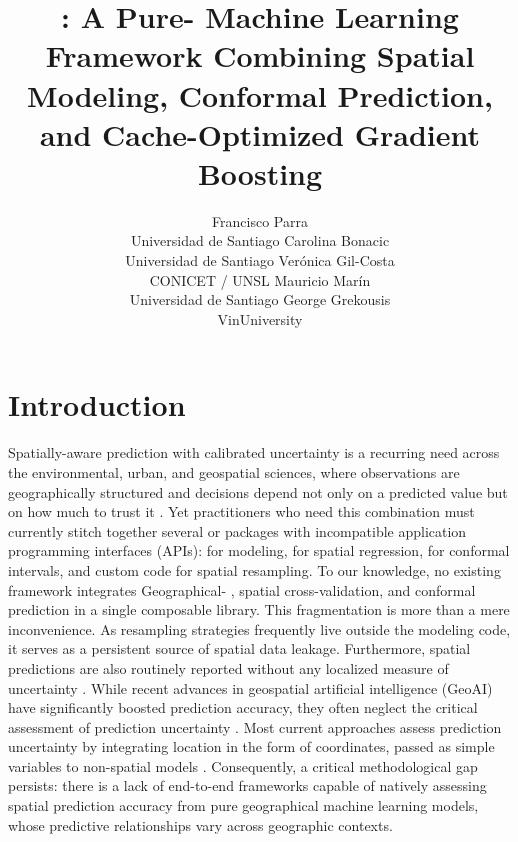 \documentclass[article]{jss}
\author{Francisco Parra\\Universidad de Santiago
   \And Carolina Bonacic\\Universidad de Santiago
   \And Ver\'onica Gil-Costa\\CONICET / UNSL
   \AND Mauricio Mar\'in\\Universidad de Santiago
   \And George Grekousis\\VinUniversity}
\title{\pkg{smelt-ml}: A Pure-\proglang{Rust} Machine Learning Framework Combining Spatial Modeling, Conformal Prediction, and Cache-Optimized Gradient Boosting}
\begin{document}

\section{Introduction} \label{sec:intro}

Spatially-aware prediction with calibrated uncertainty is a recurring need
across the environmental, urban, and geospatial sciences, where observations
are geographically structured and decisions depend not only on a predicted
value but on how much to trust it \citep{Li+Zhao+Liu:2026}. Yet practitioners
who need this combination must currently stitch together several
 or  packages with incompatible application
programming interfaces (APIs):  for modeling,
 for spatial regression,  for conformal intervals,
and custom code for spatial resampling. To our knowledge, no existing framework
integrates Geographical- \citep{Grekousis:2025}, spatial
cross-validation, and conformal prediction
\citep{Romano+Patterson+Candes:2019} in a single composable library. This
fragmentation is more than a mere inconvenience. As resampling strategies
frequently live outside the modeling code, it serves as a persistent source of
spatial data leakage. Furthermore, spatial predictions are also routinely
reported without any localized measure of uncertainty \citep{Roberts2017}.
While recent advances in geospatial artificial intelligence (GeoAI) have
significantly boosted prediction accuracy, they often neglect the critical
assessment of prediction uncertainty \citep{Luo+Chen+Gao:2025}. Most current
approaches assess prediction uncertainty by integrating location in the form
of coordinates, passed as simple variables to non-spatial models
\citep{Lou+Luo+Meng:2025}. Consequently, a critical methodological gap
persists: there is a lack of end-to-end frameworks capable of natively
assessing spatial prediction accuracy from pure geographical machine learning
models, whose predictive relationships vary across geographic contexts.
\end{document}
